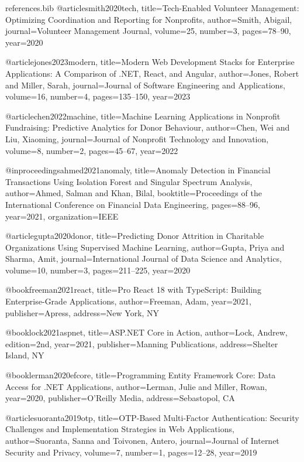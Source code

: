 \begin{filecontents}{references.bib}
@article{smith2020tech,
  title={Tech-Enabled Volunteer Management: Optimizing Coordination and Reporting for Nonprofits},
  author={Smith, Abigail},
  journal={Volunteer Management Journal},
  volume={25},
  number={3},
  pages={78--90},
  year={2020}
}

@article{jones2023modern,
  title={Modern Web Development Stacks for Enterprise Applications: A Comparison of .NET, React, and Angular},
  author={Jones, Robert and Miller, Sarah},
  journal={Journal of Software Engineering and Applications},
  volume={16},
  number={4},
  pages={135--150},
  year={2023}
}

@article{chen2022machine,
  title={Machine Learning Applications in Nonprofit Fundraising: Predictive Analytics for Donor Behaviour},
  author={Chen, Wei and Liu, Xiaoming},
  journal={Journal of Nonprofit Technology and Innovation},
  volume={8},
  number={2},
  pages={45--67},
  year={2022}
}

@inproceedings{ahmed2021anomaly,
  title={Anomaly Detection in Financial Transactions Using Isolation Forest and Singular Spectrum Analysis},
  author={Ahmed, Salman and Khan, Bilal},
  booktitle={Proceedings of the International Conference on Financial Data Engineering},
  pages={88--96},
  year={2021},
  organization={IEEE}
}

@article{gupta2020donor,
  title={Predicting Donor Attrition in Charitable Organizations Using Supervised Machine Learning},
  author={Gupta, Priya and Sharma, Amit},
  journal={International Journal of Data Science and Analytics},
  volume={10},
  number={3},
  pages={211--225},
  year={2020}
}

@book{freeman2021react,
  title={Pro React 18 with TypeScript: Building Enterprise-Grade Applications},
  author={Freeman, Adam},
  year={2021},
  publisher={Apress},
  address={New York, NY}
}

@book{lock2021aspnet,
  title={ASP.NET Core in Action},
  author={Lock, Andrew},
  edition={2nd},
  year={2021},
  publisher={Manning Publications},
  address={Shelter Island, NY}
}

@book{lerman2020efcore,
  title={Programming Entity Framework Core: Data Access for .NET Applications},
  author={Lerman, Julie and Miller, Rowan},
  year={2020},
  publisher={O'Reilly Media},
  address={Sebastopol, CA}
}

@article{suoranta2019otp,
  title={OTP-Based Multi-Factor Authentication: Security Challenges and Implementation Strategies in Web Applications},
  author={Suoranta, Sanna and Toivonen, Antero},
  journal={Journal of Internet Security and Privacy},
  volume={7},
  number={1},
  pages={12--28},
  year={2019}
}


\end{filecontents}
